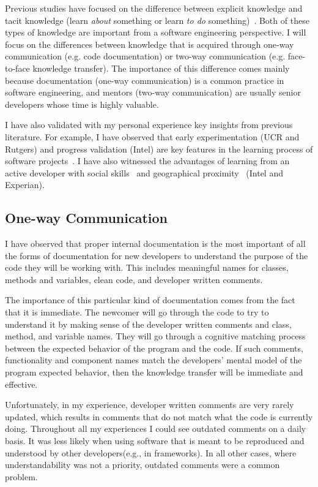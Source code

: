 \documentclass[12pt, letterpaper]{article}
\begin{document}
Previous studies have focused on the difference between explicit knowledge and tacit knowledge (learn \textit{about} 
something or learn \textit{to do} something)~\cite{cook99,civi00}. Both of these types of knowledge are important from a software
engineering perspective. I will focus on the differences between knowledge that is 
acquired through one-way communication (e.g. code documentation) or two-way communication (e.g. face-to-face knowledge transfer). The importance of this difference comes
mainly because
documentation (one-way communication) is a common practice in software engineering, 
and mentors (two-way communication) are usually senior developers 
whose time is highly valuable. 

I have also validated with my personal experience key insights from previous literature. 
For example, I have observed that early experimentation (UCR and Rutgers) and progress validation (Intel) are key features
in the learning process of software projects~\cite{Dagenais10}. I have also witnessed the advantages of 
learning from an active developer with social skills~\cite{Steinmacher12}
and geographical proximity~\cite{Whitworth06} (Intel and Experian). 

\subsection{One-way Communication}
I have observed that proper internal documentation is the most 
important of all the forms of documentation for new developers to understand the purpose of the code they will
be working with. This includes meaningful names for classes, 
methods and variables, clean code, and developer written
comments.

The importance of this particular kind of documentation comes from the fact that it is immediate.
The newcomer will go through the code to try to understand it by making sense of the 
developer written comments and class, method, and variable names. They will go through
a cognitive matching process between the expected behavior of the program and the code. 
If such comments, functionality and component names match the developers' mental model 
of the program expected behavior, then the knowledge transfer will be immediate and effective.

Unfortunately, in my experience, developer written comments are very rarely updated, which results in 
comments that do not match what the code is currently doing. Throughout all my experiences 
I could see outdated comments on a daily basis. It was less likely when using software that is 
meant to be reproduced and understood by other developers(e.g., in frameworks). In all other cases,
where understandability was not a priority, outdated comments were a common problem.
\end{document}
